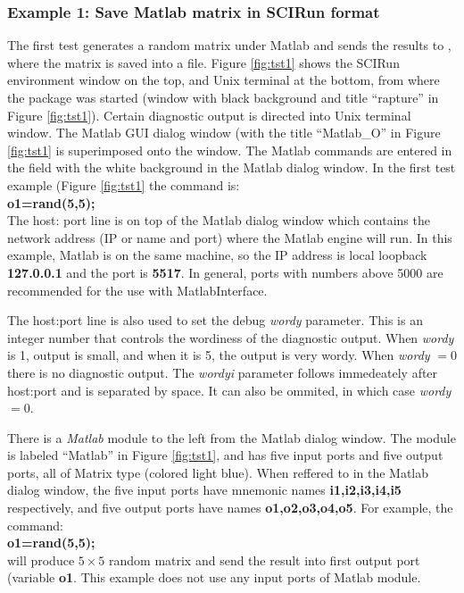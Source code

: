 \subsubsection{Example 1: Save Matlab matrix in SCIRun format} \indent

The first test generates a random matrix under Matlab and sends the
results to \sr{}, where the matrix is saved into a \sr{} file. 
Figure \ref{fig:tst1} shows the SCIRun environment window on the top,
and Unix terminal at the bottom, from where the package was started
(window with black background and title ``rapture'' in Figure 
\ref{fig:tst1}).  Certain diagnostic output is directed into Unix 
terminal window. 
The Matlab GUI dialog window (with the title
``Matlab\_O'' in Figure \ref{fig:tst1} is superimposed onto the \sr{}
window. The Matlab commands are entered in the field with the white
background in the Matlab dialog window.
In the first test example (Figure \ref{fig:tst1}
the command is: \\
{\bf o1=rand(5,5);} \\

The host:
port line is on top of the Matlab dialog window which
contains the network address (IP or name and port) where the Matlab 
engine will run. In this example, Matlab is on the same
machine, so the IP address is local loopback {\bf 127.0.0.1} and 
the port is {\bf 5517}. In general, ports with numbers above 5000
are recommended for the use with MatlabInterface. 

The host:port line is also used to set the debug {\it wordy} parameter.
This is an integer number that controls the wordiness
of the diagnostic output. When {\it wordy} is 1, output is small, and
when it is 5, the output is very wordy. When {\it wordy} $=0$ there
is no diagnostic output. The {\it wordyi} parameter follows immedeately after
host:port and is separated by space. It can also be ommited, in which
case {\it wordy} $=0$.

There is a {\it Matlab} module to the left from the Matlab dialog window. 
The module is labeled ``Matlab'' in Figure \ref{fig:tst1}, and has five input
ports and five output ports, all of Matrix type (colored light blue). 
When reffered to in the Matlab dialog window, the five input ports have mnemonic 
names {\bf i1,i2,i3,i4,i5} respectively, and five output ports have
names {\bf o1,o2,o3,o4,o5}. For example, the command: \\
{\bf o1=rand(5,5);} \\
will produce $5 \times 5$ random matrix and send the result
into first output port (variable {\bf o1}. This example does
not use any input ports of Matlab module.

